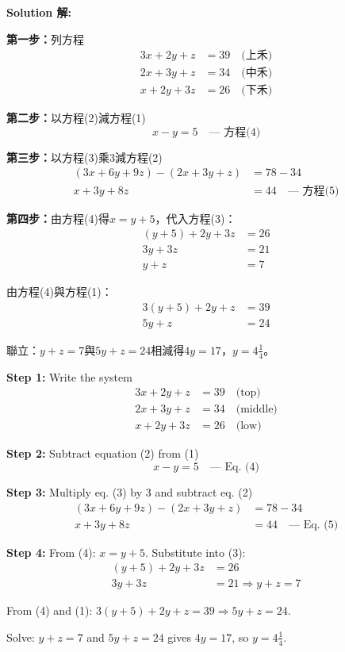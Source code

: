 \documentclass[11pt,a4paper]{article}
\newcommand{\zh}[1]{{\CJKfamily{\CJKrmdefault} #1}}
\newenvironment{chside}{%
  \begin{minipage}[t]{0.48\textwidth}%
  \setlength{\parindent}{1.5em}%
  \linespread{1.25}\selectfont%
  \small%
}{%
  \end{minipage}%
}
\newenvironment{enside}{%
  \hfill\begin{minipage}[t]{0.48\textwidth}%
  \setlength{\parindent}{1em}%
  \linespread{1.15}\selectfont%
  \small%
}{%
  \end{minipage}%
}
\newenvironment{solution}{%
  \par\medskip\noindent\textbf{\textcolor{notecolor}{Solution \zh{解}:}}\par\nopagebreak
  \small\setlength{\parindent}{1em}%
}{%
  \par\medskip%
}
\begin{document}
\begin{solution}
\noindent\begin{chside}
\textbf{第一步：}列方程
\begin{align*}
3x + 2y + z &= 39 \quad \text{(上禾)} \\
2x + 3y + z &= 34 \quad \text{(中禾)} \\
x + 2y + 3z &= 26 \quad \text{(下禾)}
\end{align*}

\textbf{第二步：}以方程(2)減方程(1)
\[ x - y = 5 \quad \text{--- 方程(4)} \]

\textbf{第三步：}以方程(3)乘3減方程(2)
\begin{align*}
(3x + 6y + 9z) - (2x + 3y + z) &= 78 - 34 \\
x + 3y + 8z &= 44 \quad \text{--- 方程(5)}
\end{align*}

\textbf{第四步：}由方程(4)得$x = y + 5$，代入方程(3)：
\begin{align*}
(y + 5) + 2y + 3z &= 26 \\
3y + 3z &= 21 \\
y + z &= 7
\end{align*}

由方程(4)與方程(1)：
\begin{align*}
3(y+5) + 2y + z &= 39 \\
5y + z &= 24
\end{align*}

聯立：$y + z = 7$與$5y + z = 24$相減得$4y = 17$，$y = 4\frac{1}{4}$。
\end{chside}%
\begin{enside}
\textbf{Step 1:} Write the system
\begin{align*}
3x + 2y + z &= 39 \quad \text{(top)} \\
2x + 3y + z &= 34 \quad \text{(middle)} \\
x + 2y + 3z &= 26 \quad \text{(low)}
\end{align*}

\textbf{Step 2:} Subtract equation (2) from (1)
\[ x - y = 5 \quad \text{--- Eq. (4)} \]

\textbf{Step 3:} Multiply eq. (3) by 3 and subtract eq. (2)
\begin{align*}
(3x + 6y + 9z) - (2x + 3y + z) &= 78 - 34 \\
x + 3y + 8z &= 44 \quad \text{--- Eq. (5)}
\end{align*}

\textbf{Step 4:} From (4): $x = y + 5$. Substitute into (3):
\begin{align*}
(y + 5) + 2y + 3z &= 26 \\
3y + 3z &= 21 \Rightarrow y + z = 7
\end{align*}

From (4) and (1): $3(y+5) + 2y + z = 39 \Rightarrow 5y + z = 24$.

Solve: $y + z = 7$ and $5y + z = 24$ gives $4y = 17$, so $y = 4\frac{1}{4}$.
\end{enside}
\end{solution}
\end{document}

